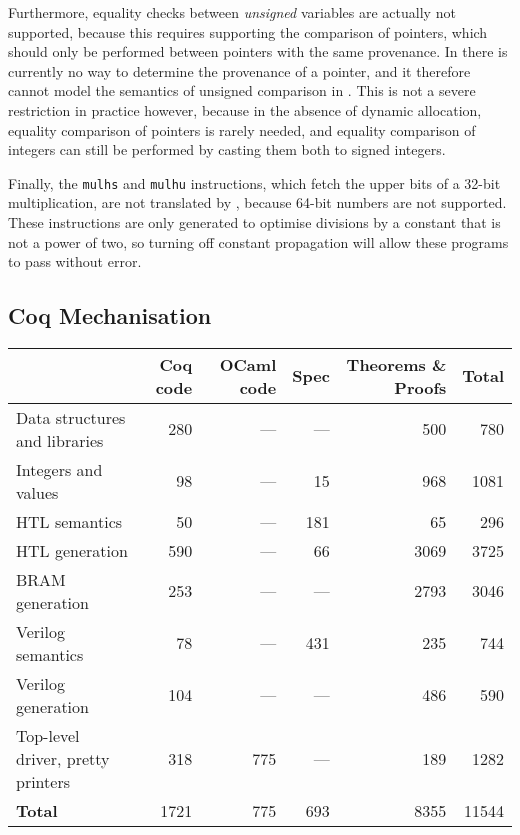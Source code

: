 Furthermore, equality checks between \emph{unsigned} variables are actually not supported, because this requires supporting the comparison of pointers, which should only be performed between pointers with the same provenance.  In \vericert{} there is currently no way to determine the provenance of a pointer, and it therefore cannot model the semantics of unsigned comparison in \compcert{}. This is not a severe restriction in practice however, because in the absence of dynamic allocation, equality comparison of pointers is rarely needed, and equality comparison of integers can still be performed by casting them both to signed integers.

Finally, the \texttt{mulhs} and \texttt{mulhu} instructions, which fetch the
upper bits of a 32-bit multiplication, are not translated by \vericert{},
because 64-bit numbers are not supported. These instructions are only generated
to optimise divisions by a constant that is not a power of two, so turning off
constant propagation will allow these programs to pass without error.

\subsection{Coq Mechanisation}

\begin{table}
  \centering
  \label{tab:proof_statistics}
  \begin{tabular}{lrrrrr}
    \toprule
    & \textbf{Coq code} & \multicolumn{1}{p{1cm}}{\raggedleft\textbf{OCaml code}} & \textbf{Spec} & \multicolumn{1}{p{2cm}}{\raggedleft\textbf{Theorems \& Proofs}} & \textbf{Total}\\
    \midrule
    {Data structures and libraries}     & 280  & --- & ---  & 500  & 780   \\
    {Integers and values}               & 98   & --- & 15   & 968  & 1081  \\
    {HTL semantics}                     & 50   & --- & 181  & 65   & 296   \\
    {HTL generation}                    & 590  & --- & 66   & 3069 & 3725  \\
    {\gls{BRAM} generation}                    & 253  & --- & ---  & 2793 & 3046  \\
    {Verilog semantics}                 & 78   & --- & 431  & 235  & 744   \\
    {Verilog generation}                & 104  & --- & ---  & 486  & 590   \\
    {Top-level driver, pretty printers} & 318  & 775 & ---  & 189  & 1282  \\
    \midrule
    \textbf{Total}                      & 1721 & 775 & 693  & 8355 & 11544 \\
    \bottomrule
  \end{tabular}
\end{table}

